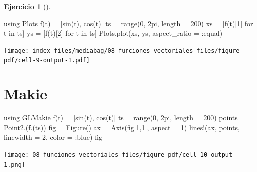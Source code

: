 \documentclass[
  a4paper,
]{scrreport}
\newenvironment{Shaded}{\begin{snugshade}}{\end{snugshade}}
\newcommand{\BuiltInTok}[1]{\textcolor[rgb]{0.00,0.23,0.31}{#1}}
\newcommand{\FloatTok}[1]{\textcolor[rgb]{0.68,0.00,0.00}{#1}}
\newcommand{\FunctionTok}[1]{\textcolor[rgb]{0.28,0.35,0.67}{#1}}
\newcommand{\ImportTok}[1]{\textcolor[rgb]{0.00,0.46,0.62}{#1}}
\newcommand{\KeywordTok}[1]{\textcolor[rgb]{0.00,0.23,0.31}{#1}}
\newcommand{\NormalTok}[1]{\textcolor[rgb]{0.00,0.23,0.31}{#1}}
\newcommand{\OperatorTok}[1]{\textcolor[rgb]{0.37,0.37,0.37}{#1}}
\theoremstyle{definition}
\newtheorem{exercise}{Ejercicio}[chapter]
\theoremstyle{remark}
\begin{document}
\begin{exercise}[]
\begin{enumerate}
\begin{tcolorbox}
\begin{Shaded}
\begin{Highlighting}[]
\ImportTok{using} \BuiltInTok{Plots}
\FunctionTok{f}\NormalTok{(t) }\OperatorTok{=}\NormalTok{ [}\FunctionTok{sin}\NormalTok{(t), }\FunctionTok{cos}\NormalTok{(t)] }
\NormalTok{ts }\OperatorTok{=} \FunctionTok{range}\NormalTok{(}\FloatTok{0}\NormalTok{, }\FloatTok{2}\NormalTok{pi, length }\OperatorTok{=} \FloatTok{200}\NormalTok{)}
\NormalTok{xs }\OperatorTok{=}\NormalTok{ [}\FunctionTok{f}\NormalTok{(t)[}\FloatTok{1}\NormalTok{] for t }\KeywordTok{in}\NormalTok{ ts]}
\NormalTok{ys }\OperatorTok{=}\NormalTok{ [}\FunctionTok{f}\NormalTok{(t)[}\FloatTok{2}\NormalTok{] for t }\KeywordTok{in}\NormalTok{ ts]}
\NormalTok{Plots.}\FunctionTok{plot}\NormalTok{(xs, ys, aspect\_ratio }\OperatorTok{=} \OperatorTok{:}\NormalTok{equal)}
\end{Highlighting}
\end{Shaded}

  \texttt{[image: index\_files/mediabag/08-funciones-vectoriales\_files/figure-pdf/cell-9-output-1.pdf]}

  \section{Makie}

\begin{Shaded}
\begin{Highlighting}[]
\ImportTok{using} \BuiltInTok{GLMakie}
\FunctionTok{f}\NormalTok{(t) }\OperatorTok{=}\NormalTok{ [}\FunctionTok{sin}\NormalTok{(t), }\FunctionTok{cos}\NormalTok{(t)] }
\NormalTok{ts }\OperatorTok{=} \FunctionTok{range}\NormalTok{(}\FloatTok{0}\NormalTok{, }\FloatTok{2}\NormalTok{pi, length }\OperatorTok{=} \FloatTok{200}\NormalTok{)}
\NormalTok{points }\OperatorTok{=} \FunctionTok{Point2}\NormalTok{.(}\FunctionTok{f}\NormalTok{.(ts))}
\NormalTok{fig }\OperatorTok{=} \FunctionTok{Figure}\NormalTok{()}
\NormalTok{ax }\OperatorTok{=} \FunctionTok{Axis}\NormalTok{(fig[}\FloatTok{1}\NormalTok{,}\FloatTok{1}\NormalTok{], aspect }\OperatorTok{=} \FloatTok{1}\NormalTok{)}
\FunctionTok{lines!}\NormalTok{(ax, points, linewidth }\OperatorTok{=} \FloatTok{2}\NormalTok{, color }\OperatorTok{=} \OperatorTok{:}\NormalTok{blue)}
\NormalTok{fig}
\end{Highlighting}
\end{Shaded}

  \texttt{[image: 08-funciones-vectoriales\_files/figure-pdf/cell-10-output-1.png]}


\end{tcolorbox}
\end{enumerate}
\end{exercise}
\end{document}
